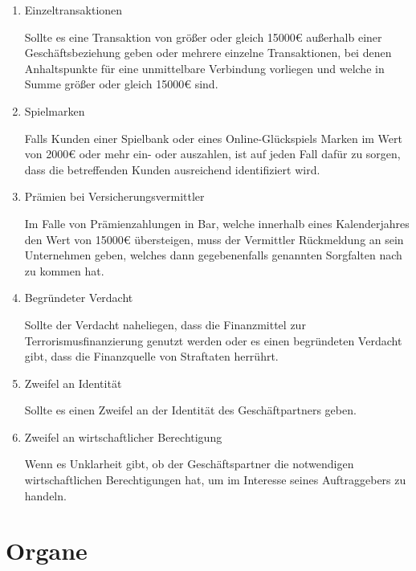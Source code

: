 \documentclass{article}
\begin{document}
        \begin{enumerate}

            \item Einzeltransaktionen

                Sollte es eine Transaktion von größer oder gleich 15000€ außerhalb einer Geschäftsbeziehung geben oder mehrere einzelne Transaktionen, bei denen Anhaltspunkte für eine unmittelbare Verbindung vorliegen und welche in Summe größer oder gleich 15000€ sind.

            \item Spielmarken

                Falls Kunden einer Spielbank oder eines Online-Glückspiels Marken im Wert von 2000€ oder mehr ein- oder auszahlen, ist auf jeden Fall dafür zu sorgen, dass die betreffenden Kunden ausreichend identifiziert wird.

            \item Prämien bei Versicherungsvermittler

                Im Falle von Prämienzahlungen in Bar, welche innerhalb eines Kalenderjahres den Wert von 15000€ übersteigen, muss der Vermittler Rückmeldung an sein Unternehmen geben, welches dann gegebenenfalls genannten Sorgfalten nach zu kommen hat.

            \item Begründeter Verdacht 

                Sollte der Verdacht naheliegen, dass die Finanzmittel zur Terrorismusfinanzierung genutzt werden oder es einen begründeten Verdacht gibt, dass die Finanzquelle von Straftaten herrührt.

            \item Zweifel an Identität

                Sollte es einen Zweifel an der Identität des Geschäftpartners geben.

            \item Zweifel an wirtschaftlicher Berechtigung

                Wenn es Unklarheit gibt, ob der Geschäftspartner die notwendigen wirtschaftlichen Berechtigungen hat, um im Interesse seines Auftraggebers zu handeln.

        \end{enumerate}    
    

    \section[Organe]{Organe}
\end{document}
